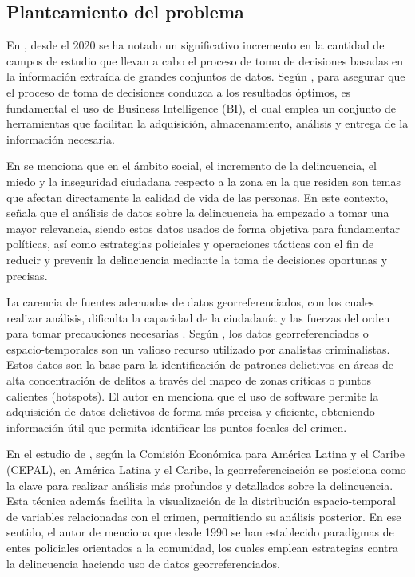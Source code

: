 \subsection{Planteamiento del problema}
En \cite{rummensMobilePhoneData2021}, desde el 2020 se ha notado un significativo incremento en la cantidad de
campos de estudio que llevan a cabo el proceso de toma de decisiones basadas en la información extraída de grandes
conjuntos de datos. Según \cite{ahishakiyePerformanceAnalysisBusiness2017}, para asegurar que el proceso de toma
de decisiones conduzca a los resultados óptimos, es fundamental el uso de Business Intelligence (BI), el cual
emplea un conjunto de herramientas que facilitan la adquisición, almacenamiento, análisis y entrega de la información
necesaria.

\bigbreak
En \cite{reidDevelopingModelPerceptions2020} se menciona que en el ámbito social, el incremento de la delincuencia,
el miedo y la inseguridad ciudadana respecto a la zona en la que residen son temas que afectan directamente la calidad
de vida de las personas. En este contexto, \cite{rummensMobilePhoneData2021} señala que el análisis de datos sobre la
delincuencia ha empezado a tomar una mayor relevancia, siendo estos datos usados de forma objetiva para fundamentar
políticas, así como estrategias policiales y operaciones tácticas con el fin de reducir y prevenir la delincuencia
mediante la toma de decisiones oportunas y precisas.

\bigbreak
La carencia de fuentes adecuadas de datos georreferenciados, con los cuales realizar análisis, dificulta la capacidad de
la ciudadanía y las fuerzas del orden para tomar precauciones necesarias \cite{tasnimNovelMultiModuleApproach2022}. Según
\cite{vieiraCrimePredictionPrevention2022}, los datos georreferenciados o espacio-temporales son un valioso recurso utilizado
por analistas criminalistas. Estos datos son la base para la identificación de patrones delictivos en áreas de alta concentración
de delitos a través del mapeo de zonas críticas o puntos calientes (hotspots). El autor en \cite{rummensMobilePhoneData2021}
menciona que el uso de software permite la adquisición de datos delictivos de forma más precisa y eficiente, obteniendo información
útil que permita identificar los puntos focales del crimen.

\bigbreak
En el estudio de \cite{unitednationsReferenceFrameworkSecurity2022}, según la Comisión Económica para América Latina y el Caribe (CEPAL),
en América Latina y el Caribe, la georreferenciación se posiciona como la clave para realizar análisis más profundos y detallados sobre la
delincuencia. Esta técnica además facilita la visualización de la distribución espacio-temporal de variables relacionadas con el crimen,
permitiendo su análisis posterior. En ese sentido, el autor de \cite{ariasCrimePunishmentLatin2023} menciona que desde 1990 se han establecido
paradigmas de entes policiales orientados a la comunidad, los cuales emplean estrategias contra la delincuencia haciendo uso de datos
georreferenciados.

